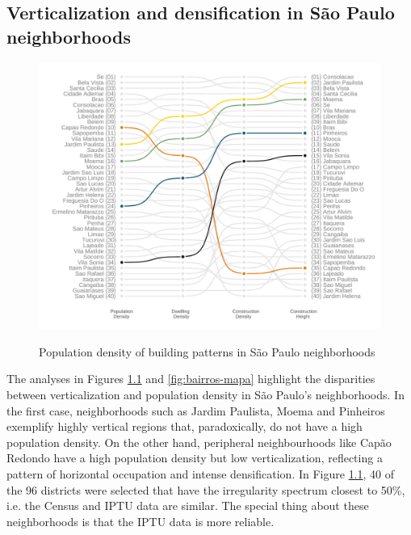 \begin{apendicesenv}
    \chapter{Verticalization and densification in São Paulo neighborhoods}
    \label{appendix:neighborhoods}
    
    \begin{figure}[!h]
        \centering
        \caption{Population density of building patterns in São Paulo neighborhoods}
        \includegraphics[width = \linewidth]{figuras/bairros.pdf}
        \label{fig:bairros}
    \end{figure}
    
    
    The analyses in Figures \ref{fig:bairros} and \ref{fig:bairros-mapa} highlight the disparities between verticalization and population density in São Paulo's neighborhoods. In the first case, neighborhoods such as Jardim Paulista, Moema and Pinheiros exemplify highly vertical regions that, paradoxically, do not have a high population density. On the other hand, peripheral neighbourhoods like Capão Redondo have a high population density but low verticalization, reflecting a pattern of horizontal occupation and intense densification. In Figure \ref{fig:bairros}, 40 of the 96 districts were selected that have the irregularity spectrum closest to 50\%, i.e. the Census and IPTU data are similar. The special thing about these neighborhoods is that the IPTU data is more reliable.
    

\end{apendicesenv}

